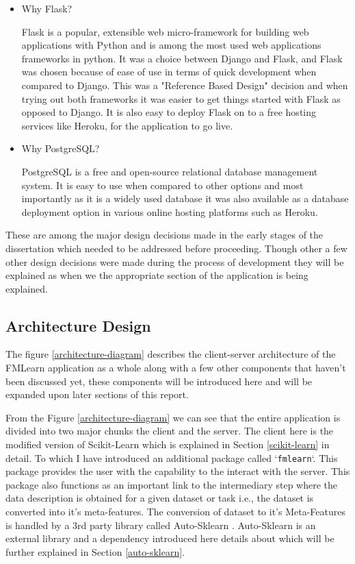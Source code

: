 \begin{itemize}
    \item Why Flask?
    
    Flask is a popular, extensible web micro-framework for building web applications with Python \citep{flask} and is among the most used web applications frameworks in python. It was a choice between Django and Flask, and Flask was chosen because of ease of use in terms of quick development when compared to Django. This was a "Reference Based Design" decision and when trying out both frameworks it was easier to get things started with Flask as opposed to Django. It is also easy to deploy Flask on to a free hosting services like Heroku, for the application to go live.
    
    \item Why PostgreSQL?
    
    PostgreSQL is a free and open-source relational database management system. It is easy to use when compared to other options and most importantly as it is a widely used database it was also available as a database deployment option in various online hosting platforms such as Heroku.
    
\end{itemize}

These are among the major design decisions made in the early stages of the dissertation which needed to be addressed before proceeding. Though other a few other design decisions were made during the process of development they will be explained as when we the appropriate section of the application is being explained.

\subsection{Architecture Design}
\label{architecture}

The figure \ref{architecture-diagram} describes the client-server architecture of the FMLearn application as a whole along with a few other components that haven't been discussed yet, these components will be introduced here and will be expanded upon later sections of this report. 

From the Figure \ref{architecture-diagram} we can see that the entire application is divided into two major chunks the client and the server. The client here is the modified version of Scikit-Learn which is explained in Section \ref{scikit-learn} in detail. To which I have introduced an additional package called `\texttt{fmlearn}`. This package provides the user with the capability to the interact with the server. This package also functions as an important link to the intermediary step where the data description is obtained for a given dataset or task i.e., the dataset is converted into it's meta-features. The conversion of dataset to it's Meta-Features is handled by a 3rd party library called Auto-Sklearn \citep{feurer:m}. Auto-Sklearn is an external library and a dependency introduced here details about which will be further explained in Section \ref{auto-sklearn}.

